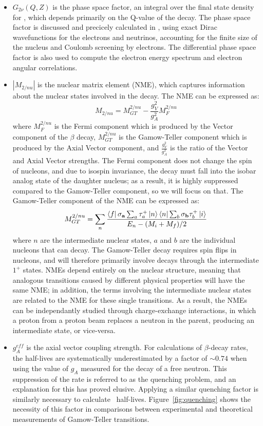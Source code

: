 \documentclass[/main.tex]{subfiles}
\begin{document}
\begin{itemize}
\item $G_{2\nu}(Q,Z)$ is the phase space factor, an integral over the final state density for \tnbb, which depends primarily on the Q-value of the decay.
  The phase space factor is discussed and precicely calculated in \cite{Kotila2012, mirea2015, stoica2019}, using exact Dirac wavefunctions for the electrons and neutrinos, accounting for the finite size of the nucleus and Coulomb screening by electrons.
  The differential phase space factor is also used to compute the electron energy spectrum and electron angular correlations.
\item $|M_{2/nu}|$ is the nuclear matrix element (NME), which captures information about the nuclear states involved in the decay.
  The NME can be expressed as:
  \begin{equation}
    M_{2/nu}=M^{2/nu}_{GT} - \frac{g_V^2}{g_A^2}M^{2/nu}_F
  \end{equation}
  where $M^{2/nu}_F$ is the Fermi component which is produced by the Vector component of the $\beta$ decay, $M^{2/nu}_{GT}$ is the Gamow-Teller component which is produced by the Axial Vector component, and $\frac{g_V^2}{g_A^2}$ is the ratio of the Vector and Axial Vector strengths.
  The Fermi component does not change the spin of nucleons, and due to isospin invariance, the decay must fall into the isobar analog state of the daughter nucleus; as a result, it is highly suppressed compared to the Gamow-Teller component, so we will focus on that.
  The Gamow-Teller component of the NME can be expressed as:
  \begin{equation}
    M^{2/nu}_{GT}=\sum_n\frac{\bra{f}\mathbf{\sigma_a}\sum_a\tau^+_a\ket{n}\bra{n}\sum_b\mathbf{\sigma_b}\tau^+_b\ket{i}}{E_n-(M_i+M_f)/2}
  \end{equation}
  where $n$ are the intermediate nuclear states, $a$ and $b$ are the individual nucleons that can decay.
  The Gamow-Teller decay requires spin flips in nucleons, and will therefore primarily involve decays through the intermediate $1^+$ states.
  NMEs depend entirely on the nuclear structure, meaning that analogous transitions caused by different physical properties will have the same NME; in addition, the terms involving the intermediate nuclear states are related to the NME for these single transitions.
  As a result, the NMEs can be independantly studied through charge-exchange interactions, in which a proton from a proton beam replaces a neutron in the parent, producing an intermediate state, or vice-versa.
\item $g^{eff}_A$ is the axial vector coupling strength.
  For calculations of $\beta$-decay rates, the half-lives are systematically underestimated by a factor of $\sim0.74$ when using the value of $g_A$ measured for the decay of a free neutron.
  This suppression of the rate is referred to as the quenching problem, and an explanation for this has proved elusive.
  Applying a similar quenching factor is similarly necessary to calculate \tnbb\ half-lives.
  Figure~\ref{fig:quenching} shows the necessity of this factor in comparisons between experimental and theoretical measurements of Gamow-Teller transitions.
\end{itemize}
\end{document}
